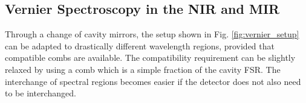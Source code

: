\documentclass[8pt,a4paper]{report}
\begin{document}
%	
%	
%	
	
	
	\subsection{Vernier Spectroscopy in the NIR and MIR}
	Through a change of cavity mirrors, the setup shown in Fig. \ref{fig:vernier_setup} can be adapted to drastically different wavelength regions, provided that compatible combs are available. The compatibility requirement can be slightly relaxed by using a comb which is a simple fraction of the cavity FSR. The interchange of spectral regions becomes easier if the detector does not also need to be interchanged. 
	
\end{document}
